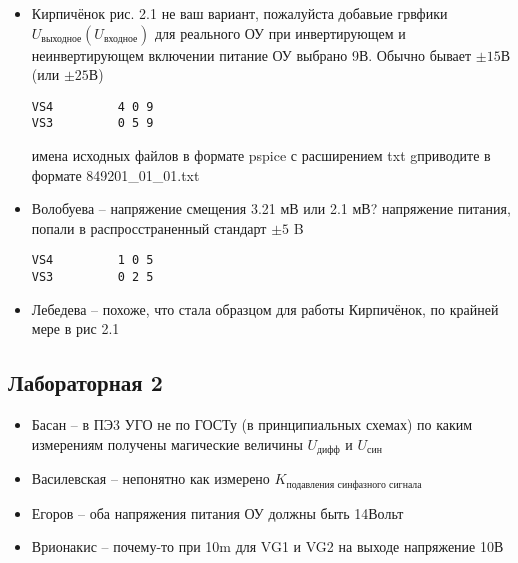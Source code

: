 \documentclass[a4paper,landscape,11pt]{article}
\begin{document}
\begin{itemize}
\item 
	Кирпичёнок рис. 2.1 не ваш вариант, пожалуйста добавьие грвфики  $U_\text{выходное}(U_\text{входное})$ для реального ОУ при инвертирующем и неинвертирующем включении
	питание ОУ выбрано 9В.  Обычно бывает $\pm 15В$ (или $\pm25В$) 
\begin{verbatim}
VS4         4 0 9
VS3         0 5 9
\end{verbatim}
имена  исходных файлов в формате pspice с расширением txt gприводите в формате 849201\_01\_01.txt

\item 
	Волобуева -- напряжение смещения 3.21 мВ или 2.1 мВ? 
напряжение питания, попали в распросстраненный стандарт $\pm5$ B
\begin{verbatim}
VS4         1 0 5
VS3         0 2 5
\end{verbatim}

\item 
	Лебедева -- похоже, что стала образцом для работы Кирпичёнок, по крайней мере в рис 2.1

\end{itemize}

\subsection*{Лабораторная 2}
\begin{itemize}
	\item Басан -- в ПЭ3  УГО не по ГОСТу (в принципиальных схемах)
по каким измерениям получены магические
величины $U_\text{дифф}$ и $U_\text{син}$
\item Василевская -- непонятно как измерено
$K_\text{подавления синфазного сигнала}$
\item Егоров -- оба напряжения питания ОУ должны быть 14Вольт
\item Врионакис -- почему-то при 10m для VG1 и VG2 на выходе напряжение 10В
\end{itemize}
\end{document}
